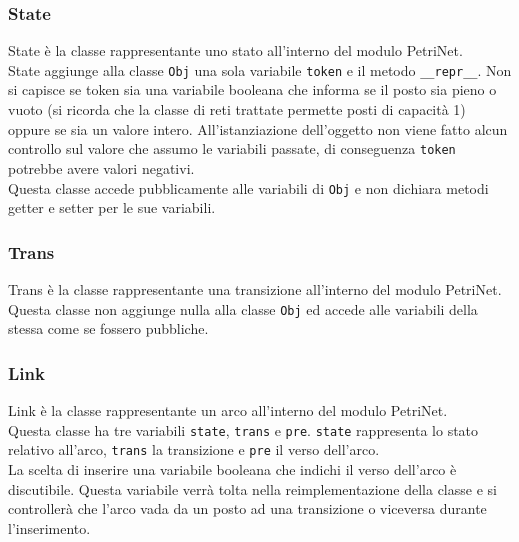 \documentclass[italian,12pt]{book}
\begin{document}
\subsubsection{State}
State è la classe rappresentante uno stato all'interno del modulo PetriNet.\\
State aggiunge alla classe {\tt Obj} una sola variabile {\tt token} e il metodo {\tt \_\_repr\_\_}.
Non si capisce se token sia una variabile booleana che informa se il posto sia pieno o vuoto (si
ricorda che la classe di reti trattate permette posti di capacità 1) oppure se sia un valore intero. 
All'istanziazione dell'oggetto non viene fatto alcun controllo sul valore che assumo le variabili 
passate, di conseguenza {\tt token} potrebbe avere valori negativi.\\
Questa classe accede pubblicamente alle variabili di {\tt Obj} e non dichiara metodi
getter e setter per le sue variabili.

\subsubsection{Trans}
Trans è la classe rappresentante una transizione all'interno del modulo PetriNet.\\
Questa classe non aggiunge nulla alla classe {\tt Obj} ed accede alle variabili della stessa 
come se fossero pubbliche.

\subsubsection{Link}
Link è la classe rappresentante un arco all'interno del modulo PetriNet.\\
Questa classe ha tre variabili {\tt state}, {\tt trans} e {\tt pre}. {\tt state} rappresenta
lo stato relativo all'arco, {\tt trans} la transizione e {\tt pre} il verso dell'arco. \\
La scelta di inserire una variabile booleana che indichi il verso dell'arco è discutibile. 
Questa variabile verrà tolta nella reimplementazione della classe e si controllerà che l'arco
vada da un posto ad una transizione o viceversa durante l'inserimento.
\end{document}

